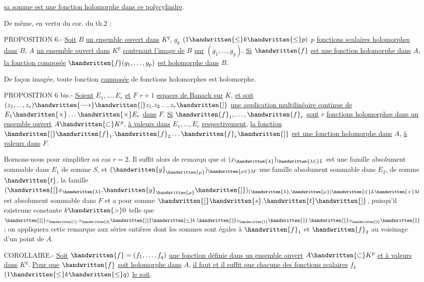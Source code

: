 \uline{sa somme est une fonction holomorphe dans ce polycylindre}.

De même, en vertu du cor. du th.2 :

PROPOSITION 6.- \uline{Soit} $B$ \uline{un ensemble ouvert dans} ${K}^{q}$, $g_k$ $(1\handwritten{\leq}k\handwritten{\leq}p)$ $p$ \uline{fonctions scalaires holomorphes dans} $B$, $A$ \uline{un ensemble ouvert dans} $K^{p}$ \uline{contenant l'image de} $B$ \uline{par} $(g_1,\ldots,g_p)$. \uline{Si} $\handwritten{f}$ \uline{est une fonction holomorphe dans} $A$, \uline{la fonction composée} $\handwritten{f}(g_1,\ldots,g_p)$ \uline{est holomorphe dans} $B$.

De façon imagée, toute fonction \uline{composée} de fonctions holomorphes est holomorphe.

PROPOSITION 6 bis.- \uline{Soient} $E_1,\ldots,E_r$ \uline{et} $F$ $r+1$ \uline{espaces de Banach sur} $K$, \uline{et soit} $(z_1,\ldotp\ldotp,z_r)\handwritten{\longrightarrow}\handwritten{[}z_1.z_2\ldots z_r\handwritten{]}$ \uline{une application multilinéaire continue de} $E_1\handwritten{\times}\ldots\handwritten{\times}E_r$ \uline{dans} $F$. \uline{Si} $\handwritten{f}_1,\ldots,\handwritten{f}_r$ \uline{sont} $r$ \uline{fonctions holomorphes dans un ensemble ouvert} $A\handwritten{\subset}K^p$, \uline{à valeurs dans} $E_1,\ldots,E_r$ \uline{respectivement}, \uline{la fonction} $\handwritten{[}\handwritten{f}_1.\handwritten{f}_2\ldots\handwritten{f}_r\handwritten{]}$ \uline{est une fonction holomorphe dans} $A$, \uline{à valeurs dans} $F$.

Bornons-nous pour simplifier au cas $r=2$. Il suffit alors de remarqu que si $(x_{\handwritten{\lambda}})_{\handwritten{\lambda\in}L}$ est une famille absolument sommable dans $E_1$ de somme $S$, et $(\handwritten{y}_{\handwritten{\mu}})_{\handwritten{\mu\in}M}$ une famille absolument sommable dans $E_2$, de somme $\handwritten{t}$, la famille $(\handwritten{[}x_{\handwritten{\lambda}}.\handwritten{y}_{\handwritten{\mu}}\handwritten{]})_{(\handwritten{\lambda},\handwritten{\mu})\handwritten{\in}L\handwritten{\times}M}$ est absolument sommable dans $F$ et a pour somme $\handwritten{[}\handwritten{s}.\handwritten{t}\handwritten{]}$, puisqu'il existeune constante $k\handwritten{>}0$ telle que $\handwritten{\|[}z_{\handwritten{1}}.z_{\handwritten{2}}\handwritten{]\|}\handwritten{\leq}k.\handwritten{\|}z_{\handwritten{1}}\handwritten{\|}.\handwritten{\|}z_{\handwritten{2}}\handwritten{\|}$ ; on appliquera cette remarque aux séries entières dont les sommes sont égales à $\handwritten{f}_1$ et $\handwritten{f}_2$ au voisinage d'un point de $A$.

COROLLAIRE.- \uline{Soit} $\handwritten{f}=(f_1,\ldots,f_q)$ \uline{une fonction définie dans un ensemble ouvert} $A\handwritten{\subset}K^p$ \uline{et à valeurs dans} $K^q$. \uline{Pour que} $\handwritten{f}$ \uline{soit holomorphe dans} $A$, \uline{il faut et il suffit que chacune des fonctions scalaires} $f_k$ $(1\handwritten{\leq}k\handwritten{\leq}q)$ \uline{le soit}.
